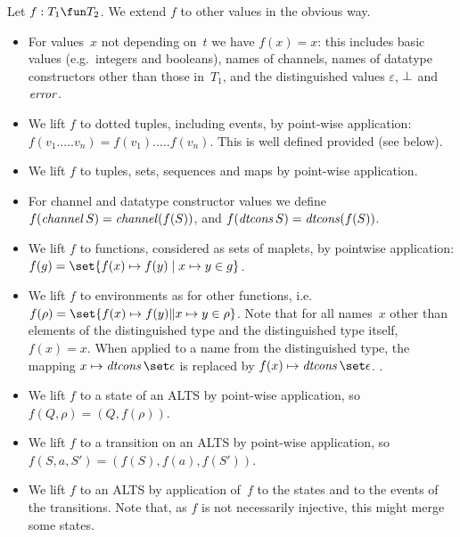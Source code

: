 Let $f : T_1 \fun T_2$.  We extend $f$ to other
values in the obvious way.
\begin{itemize}
\item For values~$x$ not depending on~$t$ we have $f(x) = x$: this includes
  basic values (e.g.~integers and booleans), names of channels, names of
  datatype constructors other than those in~$T_1$, and the distinguished values
  $\varepsilon$, $\perp$ and $\mathord{\it error}$.

\item We lift $f$ to dotted tuples, including events, by point-wise
  application: $f(v_1.\ldots.v_n) = f(v_1).\ldots.f(v_n)$.  This is well
  defined provided  (see below).

\item We lift $f$ to tuples, sets, sequences and maps by point-wise
  application.

\item For channel and datatype constructor values we define
  $f(\mathop{\it channel} S) = \mathop{\it channel} (f(S))$, and
  $f(\mathop{\it dtcons} S) = \mathop{\it dtcons} (f(S))$.

\item We lift $f$ to functions, considered as sets of maplets, by pointwise
  application: $f (g) = \set{ f(x) \mapsto f(y) \mid x \mapsto y \in g }$.

\item We lift $f$ to environments as for other functions, i.e.~$f(\rho) =
  \set{f(x) \mapsto f(y) \| x \mapsto y \in \rho}$.  Note that for all
  names~$x$ other than elements of the distinguished type and the
  distinguished type itself, $f(x) = x$.  When applied to a name from the
  distinguished type, the mapping $x \mapsto \dtcons\set\epsilon$ is replaced
  by $f(x) \mapsto \dtcons\set\epsilon$.  .

\item We lift $f$ to a state of an ALTS by point-wise application, so
  $f(Q,\rho) = (Q, f(\rho))$.

\item We lift $f$ to a transition on an ALTS by point-wise application, so
  $f(S,a,S') = (f(S), f(a), f(S'))$.

\item We lift $f$ to an ALTS by application of~$f$ to the states and to the
  events of the transitions.  Note that, as $f$ is not necessarily injective,
  this might merge some states.
\end{itemize}




